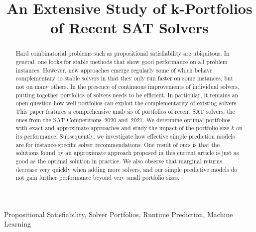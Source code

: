 \documentclass[conference]{IEEEtran}
\begin{document}
\title{An Extensive Study of k-Portfolios\\ of Recent SAT Solvers}
\author{
\and
{}
}

\maketitle

\begin{abstract}
Hard combinatorial problems such as propositional satisfiability are ubiquitous. 
In general, one looks for stable methods that show good performance on all problem instances. 
However, new approaches emerge regularly some of which behave complementary to stable solvers in that they only run faster on some instances, but not on many others. 
In the presence of continuous improvements of individual solvers, putting together portfolios of solvers needs to be efficient. 
In particular, it remains an open question how well portfolios can exploit the complementarity of existing solvers. 
This paper features a comprehensive analysis of portfolios of recent SAT solvers, the ones from the SAT Competitions~2020 and~2021. 
We determine optimal portfolios with exact and approximate approaches and study the impact of the portfolio size $k$ on its performance. 
Subsequently, we investigate how effective simple prediction models are for instance-specific solver recommendations.
One result of ours is that the solutions found by an approximate approach proposed in this current article is just as good as the optimal solution in practice. 
We also observe that marginal returns decrease very quickly when adding more solvers, and our simple predictive models do not gain further performance beyond very small portfolio sizes. 
\end{abstract}

\begin{IEEEkeywords}
Propositional Satisfiability, Solver Portfolios, Runtime Prediction, Machine Learning
\end{IEEEkeywords}
\end{document}
